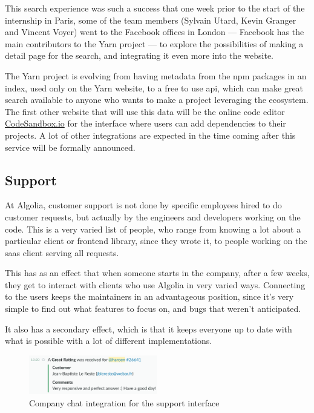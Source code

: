 This search experience was such a success that one week prior to the start of the internship in Paris, some of the team members (Sylvain Utard, Kevin Granger and Vincent Voyer) went to the Facebook offices in London --- Facebook has the main contributors to the Yarn project --- to explore the possibilities of making a detail page for the search, and integrating it even more into the website.

The Yarn project is evolving from having metadata from the npm packages in an index, used only on the Yarn website, to a free to use \acrshort{api}, which can make great search available to anyone who wants to make a project leveraging the ecosystem. The first other website that will use this data will be the online code editor \href{https://codesandbox.io}{CodeSandbox.io} for the interface where users can add dependencies to their projects. A lot of other integrations are expected in the time coming after this service will be formally announced.

\subsection{Support}
\label{support}

At Algolia, customer support is not done by specific employees hired to do customer requests, but actually by the engineers and developers working on the code. This is a very varied list of people, who range from knowing a lot about a particular client or frontend \gls{library}, since they wrote it, to people working on the \gls{saas} client serving all requests.

This has as an effect that when someone starts in the company, after a few weeks, they get to interact with clients who use Algolia in very varied ways. Connecting to the users keeps the maintainers in an advantageous position, since it's very simple to find out what features to focus on, and bugs that weren't anticipated.

It also has a secondary effect, which is that it keeps everyone up to date with what is possible with a lot of different implementations.

\begin{figure}[H]
  \centering
  \includegraphics[width=0.5\textwidth]{../assets/helpscout-integration.png}
  \caption{Company chat integration for the support interface}
  \label{figure:support}
\end{figure}


